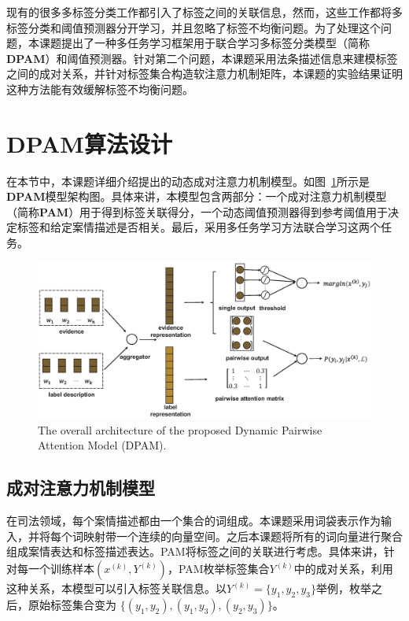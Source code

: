 现有的很多多标签分类工作都引入了标签之间的关联信息，然而，这些工作都将多标签分类和阈值预测器分开学习，并且忽略了标签不均衡问题。为了处理这个问题，本课题提出了一种多任务学习框架用于联合学习多标签分类模型（简称\textbf{DPAM}）和阈值预测器。针对第二个问题，本课题采用法条描述信息来建模标签之间的成对关系，并针对标签集合构造软注意力机制矩阵，本课题的实验结果证明这种方法能有效缓解标签不均衡问题。

\section{DPAM算法设计}
\label{sec:dpam_algori}

在本节中，本课题详细介绍提出的动态成对注意力机制模型。如图~\ref{fig:model}所示是\textbf{DPAM}模型架构图。具体来讲，本模型包含两部分：一个成对注意力机制模型（简称\textbf{PAM}）用于得到标签关联得分，一个动态阈值预测器得到参考阈值用于决定标签和给定案情描述是否相关。最后，采用多任务学习方法联合学习这两个任务。

\begin{figure}[t!]
\centering
\includegraphics[scale=0.4,viewport=0 30 980 500,clip=true]{./sources/DPAM.eps}
\vspace{-10pt}
\caption{\label{fig:model} The overall architecture of the proposed Dynamic Pairwise Attention Model (DPAM). }
\vspace{-5pt}
\end{figure}


\subsection{成对注意力机制模型}
在司法领域，每个案情描述都由一个集合的词组成。本课题采用词袋表示作为输入，并将每个词映射带一个连续的向量空间。之后本课题将所有的词向量进行聚合组成案情表达和标签描述表达。PAM将标签之间的关联进行考虑。具体来讲，针对每一个训练样本$(x^{(k)}, Y^{(k)})$，PAM枚举标签集合$Y^{(k)}$中的成对关系，利用这种关系，本模型可以引入标签关联信息。以$Y^{(k)}=\{y_1,y_2,y_3\}$举例，枚举之后，原始标签集合变为 $\{(y_1,y_2),(y_1,y_3),(y_2,y_3)\}$。

